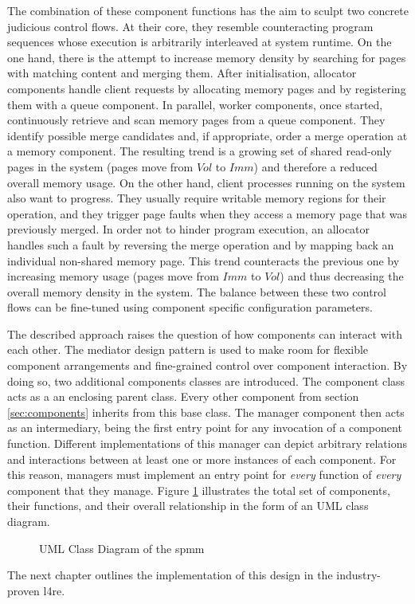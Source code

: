 The combination of these component functions has the aim to sculpt two concrete judicious control flows.
At their core, they resemble counteracting program sequences whose execution is arbitrarily interleaved at system runtime.
On the one hand, there is the attempt to increase memory density by searching for pages with matching content and merging them.
After initialisation, allocator components handle client requests by allocating memory pages and by registering them with a queue component.
In parallel, worker components, once started, continuously retrieve and scan memory pages from a queue component.
They identify possible merge candidates and, if appropriate, order a merge operation at a memory component.
The resulting trend is a growing set of shared read-only pages in the system (pages move from $Vol$ to $Imm$) and therefore a reduced overall memory usage.
On the other hand, client processes running on the system also want to progress.
They usually require writable memory regions for their operation, and they trigger page faults when they access a memory page that was previously merged.
In order not to hinder program execution, an allocator handles such a fault by reversing the merge operation and by mapping back an individual non-shared memory page.
This trend counteracts the previous one by increasing memory usage (pages move from $Imm$ to $Vol$) and thus decreasing the overall memory density in the system.
The balance between these two control flows can be fine-tuned using component specific configuration parameters.

The described approach raises the question of how components can interact with each other.
The mediator design pattern is used to make room for flexible component arrangements and fine-grained control over component interaction.
By doing so, two additional components classes are introduced.
The component class acts as a an enclosing parent class.
Every other component from section \ref{sec:components} inherits from this base class.
The manager component then acts as an intermediary, being the first entry point for any invocation of a component function.
Different implementations of this manager can depict arbitrary relations and interactions between at least one or more instances of each component.
For this reason, managers must implement an entry point for \emph{every} function of \emph{every} component that they manage.
Figure \ref{fig:umlcd} illustrates the total set of components, their functions, and their overall relationship in the form of an UML class diagram.

\begin{figure}
  \centering
  
  \caption{UML Class Diagram of the \acs{spmm}}
  \label{fig:umlcd}
\end{figure}

The next chapter outlines the implementation of this design in the industry-proven \acl{l4re}.
